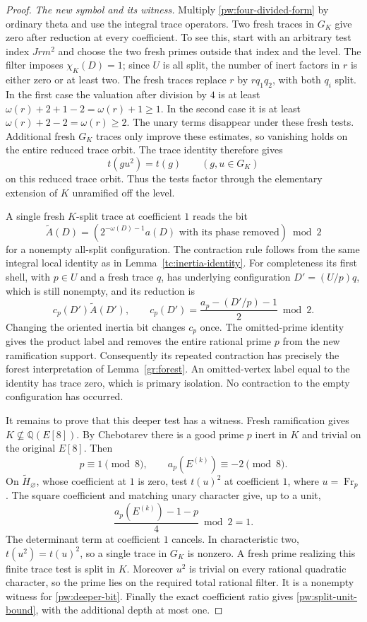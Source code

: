 \begin{proof}
\smallskip\noindent\emph{The new symbol and its witness.}
Multiply \eqref{pw:four-divided-form} by ordinary theta and use the
integral trace operators.  Two fresh traces in $G_K$ give zero after
reduction at every coefficient.  To see this, start with an arbitrary
test index $Jrm^2$ and choose the two fresh primes outside that index
and the level.  The filter imposes $\chi_K(D)=1$; since $U$ is all split,
the number of inert factors in $r$ is either zero or at least two.
The fresh traces replace $r$ by $rq_1q_2$, with both $q_i$ split.
In the first case the valuation after division by $4$ is at least
$\omega(r)+2+1-2=\omega(r)+1\ge1$.  In the second case it is at least
$\omega(r)+2-2=\omega(r)\ge2$.  The unary terms disappear under these
fresh tests.  Additional fresh $G_K$ traces only improve these estimates,
so vanishing holds on the entire reduced trace orbit.  The trace identity
therefore gives
\[
 t(gu^2)=t(g)\qquad(g,u\in G_K)
\]
on this reduced trace orbit.  Thus the tests factor through the elementary
extension of $K$ unramified off the level.

A single fresh $K$-split trace at coefficient $1$ reads the bit
\begin{equation}\label{pw:deeper-bit}
 \widetilde A(D)=
 \left(2^{-\omega(D)-1}a(D)\text{ with its phase removed}\right)\bmod2
\end{equation}
for a nonempty all-split configuration.  The contraction rule follows
from the same integral local identity as in Lemma~\ref{tc:inertia-identity}.
For completeness its first shell, with $p\in U$ and a fresh trace $q$,
has underlying configuration $D'=(U/p)q$, which is still nonempty, and
its reduction is
\[
 c_p(D')\widetilde A(D'),\qquad
 c_p(D')=\frac{a_p-(D'/p)-1}{2}\bmod2.
\]
Changing the oriented inertia bit changes $c_p$ once.  The omitted-prime
identity gives the product label and removes the entire rational prime
$p$ from the new ramification support.  Consequently its repeated
contraction has precisely the forest interpretation of
Lemma~\ref{gr:forest}.  An omitted-vertex label equal to the identity has
trace zero, which is primary isolation.  No contraction to the empty
configuration has occurred.

It remains to prove that this deeper test has a witness.  Fresh
ramification gives $K\not\subseteq\mathbb Q(E[8])$.  By Chebotarev there
is a good prime $p$ inert in $K$ and trivial on the original $E[8]$.
Then
\[
 p\equiv1\pmod8,\qquad a_p(E^{(k)})\equiv-2\pmod8.
\]
On $\widetilde H_\varnothing$, whose coefficient at $1$ is zero, test
$t(u)^2$ at coefficient $1$, where $u=\operatorname{Fr}_p$.  The square
coefficient and matching unary character give, up to a unit,
\[
 \frac{a_p(E^{(k)})-1-p}{4}\bmod2=1.
\]
The determinant term at coefficient $1$ cancels.  In characteristic two,
$t(u^2)=t(u)^2$, so a single trace in $G_K$ is nonzero.  A fresh prime
realizing this finite trace test is split in $K$.  Moreover $u^2$ is
trivial on every rational quadratic character, so the prime lies on the
required total rational filter.  It is a nonempty witness for
\eqref{pw:deeper-bit}.  Finally the exact coefficient ratio gives
\eqref{pw:split-unit-bound}, with the additional depth at most one.
\end{proof}

